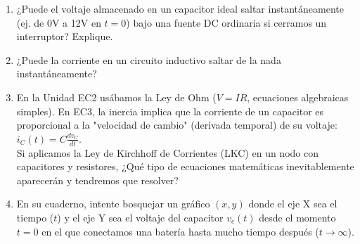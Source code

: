 \documentclass[11pt, a4paper]{article}
\begin{document}
\begin{enumerate}
    \item ¿Puede el voltaje almacenado en un capacitor ideal saltar instantáneamente (ej. de 0V a 12V en $t=0$) bajo una fuente DC ordinaria si cerramos un interruptor? Explique.
    \vspace{2cm}
    \item ¿Puede la corriente en un circuito inductivo saltar de la nada instantáneamente?
    \vspace{2cm}
    \item En la Unidad EC2 usábamos la Ley de Ohm ($V = IR$, ecuaciones algebraicas simples). En EC3, la inercia implica que la corriente de un capacitor es proporcional a la "velocidad de cambio" (derivada temporal) de su voltaje: $i_C(t) = C \frac{dv_C}{dt}$. \\
    Si aplicamos la Ley de Kirchhoff de Corrientes (LKC) en un nodo con capacitores y resistores, ¿Qué tipo de ecuaciones matemáticas inevitablemente aparecerán y tendremos que resolver?
    \vspace{2cm}
    \item En su cuaderno, intente bosquejar un gráfico $(x, y)$ donde el eje X sea el tiempo ($t$) y el eje Y sea el voltaje del capacitor $v_c(t)$ desde el momento $t=0$ en el que conectamos una batería hasta mucho tiempo después ($t \to \infty$).
\end{enumerate}
\end{document}
